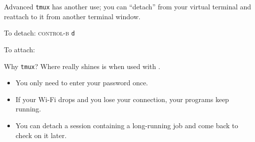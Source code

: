 \begin{frame}{Advanced \texttt{tmux}}
   has another use; you can \enquote{detach} from your virtual
  terminal and reattach to it from another terminal window.

  To detach: \textsc{control-b} \texttt{d}

  To attach: 
\end{frame}

\begin{frame}{Why \texttt{tmux}?}
  Where  really shines is when used with .

  \begin{itemize}
    \item You only need to enter your  password once. \item If your
      Wi-Fi drops and you lose your  connection, your programs keep
      running.
    \item You can detach a  session containing a long-running job and
      come back to check on it later.
  \end{itemize}
\end{frame}


